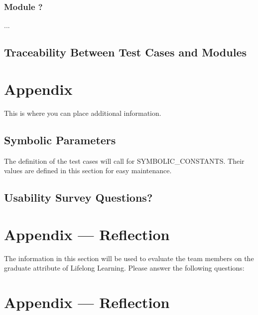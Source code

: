\documentclass[12pt, titlepage]{article}
\begin{document}
\subsubsection{Module ?}

...

\subsection{Traceability Between Test Cases and Modules}

				




\newpage

\section{Appendix}

This is where you can place additional information.

\subsection{Symbolic Parameters}

The definition of the test cases will call for SYMBOLIC\_CONSTANTS.
Their values are defined in this section for easy maintenance.

\subsection{Usability Survey Questions?}


\newpage{}
\section*{Appendix --- Reflection}

The information in this section will be used to evaluate the team members on the
graduate attribute of Lifelong Learning.  Please answer the following questions:

\newpage{}
\section*{Appendix --- Reflection}
\end{document}
